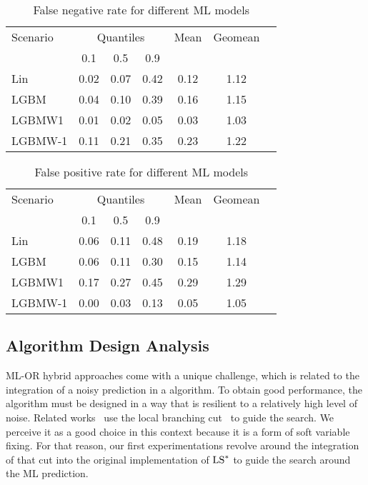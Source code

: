 \documentclass[3p, authoryear, times, doubleblind]{elsarticle}
\begin{document}
{\begin{table}[h]
\centering
\caption{False negative rate for different ML models}
\label{tab:false_negative_rate}
\begin{tabular}{lcccccc}
\toprule
{Scenario} & \multicolumn{3}{c}{Quantiles} & {Mean} & {Geomean} \\
{} & {0.1} & {0.5} & {0.9} & {} & {} \\
\midrule
Lin & 0.02 & 0.07 & 0.42 & 0.12 & 1.12 \\
LGBM & 0.04 & 0.10 & 0.39 & 0.16 & 1.15 \\
LGBMW1 & 0.01 & 0.02 & 0.05 & 0.03 & 1.03 \\
LGBMW-1 & 0.11 & 0.21 & 0.35 & 0.23 & 1.22 \\
\bottomrule
\end{tabular}
\end{table}


\begin{table}[h]
\centering
\caption{False positive rate for different ML models}
\label{tab:false_positive_rate}
\begin{tabular}{lcccccc}
\toprule
{Scenario} & \multicolumn{3}{c}{Quantiles} & {Mean} & {Geomean} \\
{} & {0.1} & {0.5} & {0.9} & {} & {} \\
\midrule
Lin & 0.06 & 0.11 & 0.48 & 0.19 & 1.18 \\
LGBM & 0.06 & 0.11 & 0.30 & 0.15 & 1.14 \\
LGBMW1 & 0.17 & 0.27 & 0.45 & 0.29 & 1.29 \\
LGBMW-1 & 0.00 & 0.03 & 0.13 & 0.05 & 1.05 \\
\bottomrule
\end{tabular}
\end{table}



\subsection{Algorithm Design Analysis} \label{sec:algo_design}
ML-OR hybrid approaches  come with a unique challenge, which is related to the integration of a noisy prediction in a  algorithm. To obtain good performance, the algorithm must be designed in a way that is resilient to a relatively high level of noise.  Related works~\citep{ding_accelerating_2020} use the local branching cut~ to guide the search. We perceive it as a good choice in this context because it is a form of soft variable fixing. For that reason, our first experimentations revolve around the integration of that cut into the original implementation of $\text{LS}^*$ to guide the search around the ML prediction. 

}
\end{document}
